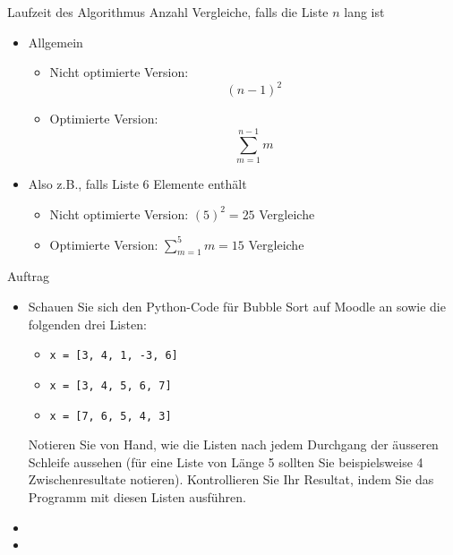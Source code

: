 \begin{frame}[fragile]{Laufzeit des Algorithmus}
Anzahl Vergleiche, falls die Liste $n$ lang ist
\begin{itemize}[<+->]
	\item Allgemein
	\begin{itemize}
	\item Nicht optimierte Version: 
	\[(n-1)^2\]
	\item Optimierte Version:
	\[\sum_{m=1}^{n-1}m \]
	\end{itemize}
	\item Also z.B., falls Liste 6 Elemente enthält
	\begin{itemize}
	\item Nicht optimierte Version: $(5)^2=25$ Vergleiche
	\item Optimierte Version: $\sum_{m=1}^{5}m = 15$ Vergleiche
	\end{itemize}
\end{itemize}
\end{frame}


\begin{frame}[fragile]{Auftrag}
\begin{itemize}
\item Schauen Sie sich den Python-Code für Bubble Sort auf Moodle an sowie die folgenden drei Listen:
\begin{itemize}
\item \lstinline|x = [3, 4, 1, -3, 6]|
\item \lstinline|x = [3, 4, 5, 6, 7]|
\item \lstinline|x = [7, 6, 5, 4, 3]|
\end{itemize}
Notieren Sie von Hand, wie die Listen nach jedem Durchgang der äusseren Schleife aussehen (für eine Liste von Länge 5 sollten Sie beispielsweise 4 Zwischenresultate notieren). Kontrollieren Sie Ihr Resultat, indem Sie das Programm mit diesen Listen ausführen.
\item {}
\item {}
\end{itemize}
\end{frame}

